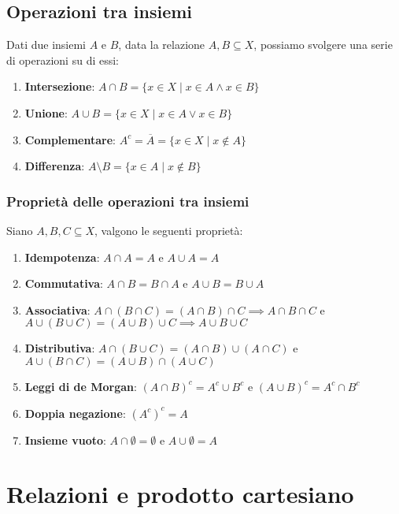 \documentclass[a4paper, 12pt]{report}
\theoremstyle{definition}
\theoremstyle{remark}
\theoremstyle{plain}
\begin{document}
\subsection{Operazioni tra insiemi}

Dati due insiemi $A$ e $B$, data la relazione $A, B \subseteq X$, possiamo svolgere una serie di operazioni su di essi:
\begin{enumerate}
    \item \textbf{Intersezione}: $A \cap B = \{ x \in X \mid x \in A \land x \in B\}$
    \item \textbf{Unione}: $A \cup B = \{x \in X \mid x \in A \lor x \in B\}$
    \item \textbf{Complementare}: $A^c = \overline{A} = \{ x \in X \mid x \notin A\}$
    \item \textbf{Differenza}: $A \setminus B = \{ x \in A \mid x \notin B\}$
\end{enumerate}

\subsubsection{Proprietà delle operazioni tra insiemi}
Siano $A, B, C \subseteq X$, valgono le seguenti proprietà:
\begin{enumerate}
    \item \textbf{Idempotenza}: $A \cap A = A$ e $A \cup A = A$
    \item \textbf{Commutativa}: $A \cap B = B \cap A$ e $A \cup B = B \cup A$
    \item \textbf{Associativa}: $A \cap (B \cap C) = (A \cap B) \cap C \implies A \cap B \cap C$ e $A \cup (B \cup C) = (A \cup B) \cup C \implies A \cup B \cup C$
    \item \textbf{Distributiva}: $A \cap (B \cup C) = (A \cap B) \cup (A \cap C)$ e $A \cup (B \cap C) = (A \cup B) \cap (A \cup C)$
    \item \textbf{Leggi di de Morgan}: $(A \cap B)^c = A^c \cup B^c$ e $(A \cup B)^c = A^c \cap B^c$
    \item \textbf{Doppia negazione}: $(A^c)^c = A$
    \item \textbf{Insieme vuoto}: $A \cap \emptyset = \emptyset$ e $A \cup \emptyset = A$
\end{enumerate}

\section{Relazioni e prodotto cartesiano}
\end{document}

